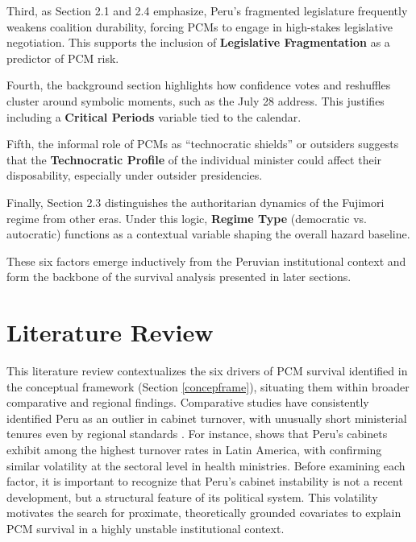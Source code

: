 \documentclass[a4paper, 12pt]{article}
\begin{document}
Third, as Section 2.1 and 2.4 emphasize, Peru’s fragmented legislature frequently weakens coalition durability, forcing PCMs to engage in high-stakes legislative negotiation. This supports the inclusion of \textbf{Legislative Fragmentation} as a predictor of PCM risk.

Fourth, the background section highlights how confidence votes and reshuffles cluster around symbolic moments, such as the July 28 address. This justifies including a \textbf{Critical Periods} variable tied to the calendar.

Fifth, the informal role of PCMs as ``technocratic shields'' or outsiders suggests that the \textbf{Technocratic Profile} of the individual minister could affect their disposability, especially under outsider presidencies.

Finally, Section 2.3 distinguishes the authoritarian dynamics of the Fujimori regime from other eras. Under this logic, \textbf{Regime Type} (democratic vs. autocratic) functions as a contextual variable shaping the overall hazard baseline.

These six factors emerge inductively from the Peruvian institutional context and form the backbone of the survival analysis presented in later sections.



\section{Literature Review}\label{sec:letrev}


This literature review contextualizes the six drivers of PCM survival identified in the conceptual framework (Section \ref{concepframe}), situating them within broader comparative and regional findings. Comparative studies have consistently identified Peru as an outlier in cabinet turnover, with unusually short ministerial tenures even by regional standards \citep{martinez-gallardo_out_2012, gozzer_duracion_2021}. For instance, \citet{martinez-gallardo_out_2012} shows that Peru's cabinets exhibit among the highest turnover rates in Latin America, with \citet{gozzer_duracion_2021} confirming similar volatility at the sectoral level in health ministries. Before examining each factor, it is important to recognize that Peru's cabinet instability is not a recent development, but a structural feature of its political system. This volatility motivates the search for proximate, theoretically grounded covariates to explain PCM survival in a highly unstable institutional context.
\end{document}
